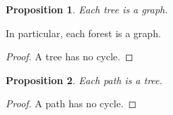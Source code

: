 \documentclass{article}
\newtheorem{proposition}{Proposition}
\begin{document}
\begin{proposition} Each tree is a graph. \end{proposition}

In particular, each forest is a graph.

\begin{proof} A tree has no cycle. \end{proof}
\begin{proposition} Each path is a tree. \end{proposition}

\begin{sloppypar}
\begin{proof} A path has no cycle. \end{proof}
\end{sloppypar}
\end{document}

